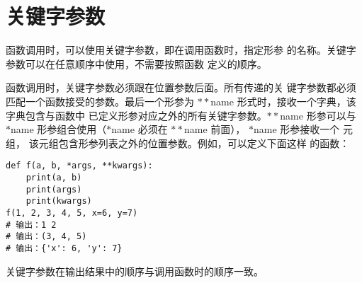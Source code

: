 \documentclass[a4paper, 12pt]{article}
\begin{document}
\section{关键字参数}
函数调用时，可以使用关键字参数，即在调用函数时，指定形参
的名称。关键字参数可以在任意顺序中使用，不需要按照函数
定义的顺序。\par
函数调用时，关键字参数必须跟在位置参数后面。所有传递的关
键字参数都必须匹配一个函数接受的参数。最后一个形参为 
$\ast\ast$name 形式时，接收一个字典，该字典包含与函数中
已定义形参对应之外的所有关键字参数。$\ast\ast$name 
形参可以与 $\ast$name 形参组合使用（$\ast$name 必须在 
$\ast\ast$name 前面）， $\ast$name 形参接收一个 元组，
该元组包含形参列表之外的位置参数。例如，可以定义下面这样
的函数：\par
\begin{listing}[h!]
\begin{verbatim}
def f(a, b, *args, **kwargs):
    print(a, b)
    print(args)
    print(kwargs)
f(1, 2, 3, 4, 5, x=6, y=7)
# 输出：1 2
# 输出：(3, 4, 5)
# 输出：{'x': 6, 'y': 7}
\end{verbatim}
\end{listing}
关键字参数在输出结果中的顺序与调用函数时的顺序一致。\par
\end{document}
